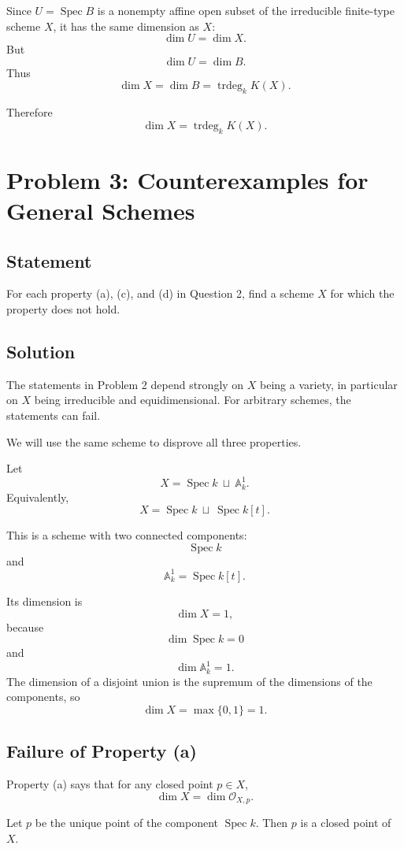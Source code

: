 \documentclass[12pt,a4paper]{article}
\DeclareMathOperator{\Spec}{Spec}
\newcommand{\trdeg}{\operatorname{trdeg}}
\providecommand{\Spec}{\operatorname{Spec}}
\theoremstyle{notespace}
\begin{document}
Since \(U=\Spec B\) is a nonempty affine open subset of the irreducible finite-type scheme \(X\), it has the same dimension as \(X\):
\[
\dim U=\dim X.
\]
But
\[
\dim U=\dim B.
\]
Thus
\[
\dim X=\dim B=\trdeg_k K(X).
\]

Therefore
\[
\boxed{\dim X=\trdeg_k K(X).}
\]

\newpage

\section{Problem 3: Counterexamples for General Schemes}

\subsection*{Statement}

For each property (a), (c), and (d) in Question 2, find a scheme \(X\) for which the property does not hold.

\subsection*{Solution}

The statements in Problem 2 depend strongly on \(X\) being a variety, in particular on \(X\) being irreducible and equidimensional. For arbitrary schemes, the statements can fail.

We will use the same scheme to disprove all three properties.

Let
\[
X=\Spec k\ \sqcup\ \mathbb A^1_k.
\]
Equivalently,
\[
X=\Spec k\ \sqcup\ \Spec k[t].
\]

This is a scheme with two connected components:
\[
\Spec k
\]
and
\[
\mathbb A^1_k=\Spec k[t].
\]

Its dimension is
\[
\dim X=1,
\]
because
\[
\dim \Spec k=0
\]
and
\[
\dim \mathbb A^1_k=1.
\]
The dimension of a disjoint union is the supremum of the dimensions of the components, so
\[
\dim X=\max\{0,1\}=1.
\]

\subsection{Failure of Property (a)}

Property (a) says that for any closed point \(p\in X\),
\[
\dim X=\dim \mathcal O_{X,p}.
\]

Let \(p\) be the unique point of the component \(\Spec k\). Then \(p\) is a closed point of \(X\).
\end{document}
